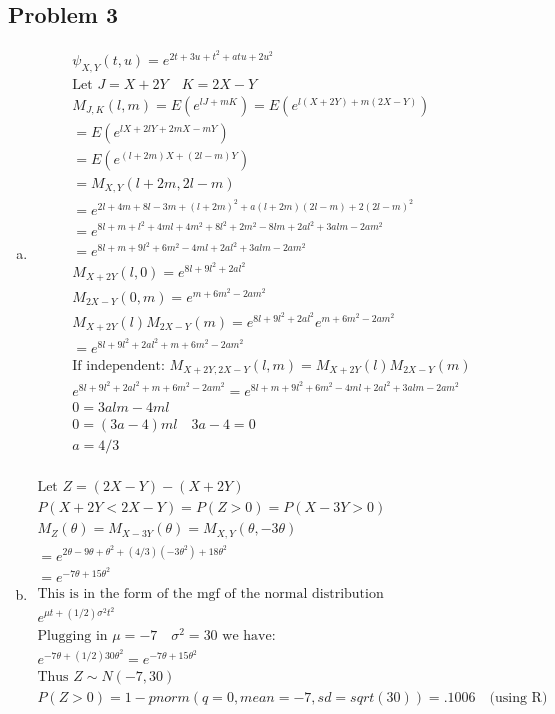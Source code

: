 \documentclass{article}
\begin{document}
\begin{flushleft}
\section*{Problem 3}
\begin{enumerate}[(a)]
\item
\begin{multline*}
\psi_{X,Y}(t,u)=e^{2t+3u+t^2+atu+2u^2}\\
\text{Let } J=X+2Y \quad K=2X-Y\\
M_{J,K}(l,m)=E(e^{lJ+mK})=E(e^{l(X+2Y)+m(2X-Y)})\\
=E(e^{lX+2lY+2mX-mY})\\
=E(e^{(l+2m)X+(2l-m)Y})\\
=M_{X,Y}(l+2m,2l-m)\\
=e^{2l+4m+8l-3m+(l+2m)^2+a(l+2m)(2l-m)+2(2l-m)^2}\\
=e^{8l+m+l^2+4ml+4m^2+8l^2+2m^2-8lm+2al^2+3alm-2am^2}\\
=e^{8l+m+9l^2+6m^2-4ml+2al^2+3alm-2am^2}\\
M_{X+2Y}(l,0)=e^{8l+9l^2+2al^2}\\
M_{2X-Y}(0,m)=e^{m+6m^2-2am^2}\\
M_{X+2Y}(l)M_{2X-Y}(m)=e^{8l+9l^2+2al^2}e^{m+6m^2-2am^2}\\
=e^{8l+9l^2+2al^2+m+6m^2-2am^2}\\
\text{If independent: } M_{X+2Y,2X-Y}(l,m)=M_{X+2Y}(l)M_{2X-Y}(m)\\
e^{8l+9l^2+2al^2+m+6m^2-2am^2}=e^{8l+m+9l^2+6m^2-4ml+2al^2+3alm-2am^2}\\
0=3alm-4ml\\
0=(3a-4)ml \quad 3a-4=0\\
a=4/3\\
\end{multline*}
\item 
\begin{multline*}
\text{Let } Z=(2X-Y)-(X+2Y)\\
P(X+2Y<2X-Y)=P(Z>0)=P(X-3Y>0)\\
M_Z(\theta)=M_{X-3Y}(\theta)=M_{X,Y}(\theta,-3\theta)\\
=e^{2\theta-9\theta+\theta^2+(4/3)(-3\theta^2)+18\theta^2}\\
=e^{-7\theta+15\theta^2}\\
\text{This is in the form of the mgf of the normal distribution}\\
e^{\mu t+(1/2)\sigma^2t^2}\\
\text{Plugging in } \mu=-7 \quad \sigma^2=30 \text{ we have:}\\
e^{-7\theta+(1/2)30\theta^2}=e^{-7\theta+15\theta^2}\\ 
\text{Thus } Z\sim N(-7,30)\\
P(Z>0)= 1-pnorm(q=0,mean = -7,sd=sqrt(30))=.1006 \quad \text{(using R)}\\
\end{multline*}
\end{enumerate}

\end{flushleft}
\end{document}
